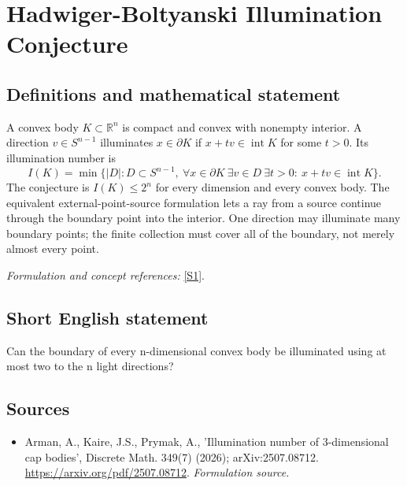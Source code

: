 \documentclass[11pt]{article}
\begin{document}
\section*{\texorpdfstring{Hadwiger-Boltyanski Illumination Conjecture}{Hadwiger-Boltyanski Illumination Conjecture}}\label{473}
\subsection{Definitions and mathematical statement}
A convex body $K\subset{\mathbb{R}}^n$ is compact and convex with nonempty interior. A direction $v\in S^{n-1}$ illuminates $x\in\partial K$ if $x+tv\in\operatorname{int}K$ for some $t>0$. Its illumination number is
\[
 I(K)=\min\{|D|:D\subset S^{n-1},\
 \forall x\in\partial K\ \exists v\in D\ \exists t>0:\
 x+tv\in\operatorname{int}K\}.
\]
The conjecture is $I(K)\le2^n$ for every dimension and every convex body. The equivalent external-point-source formulation lets a ray from a source continue through the boundary point into the interior. One direction may illuminate many boundary points; the finite collection must cover all of the boundary, not merely almost every point.
\par\smallskip\textit{Formulation and concept references:} \href{https://arxiv.org/pdf/2507.08712}{[S1]}.

\subsection{Short English statement}
Can the boundary of every n-dimensional convex body be illuminated using at most two to the n light directions?
\subsection{Sources}
\begin{itemize}
\item[S1]Arman, A., Kaire, J.S., Prymak, A., 'Illumination number of 3-dimensional cap bodies', Discrete Math. 349(7) (2026); arXiv:2507.08712.
\url{https://arxiv.org/pdf/2507.08712}.
\textit{Formulation source.}
\end{itemize}
\end{document}
